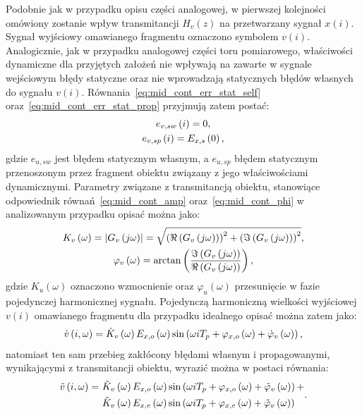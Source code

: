 Podobnie jak w przypadku opisu części analogowej, w pierwszej kolejności omówiony zostanie wpływ transmitancji $H_{v}(z)$ na przetwarzany sygnał $x(i)$. Sygnał wyjściowy omawianego fragmentu oznaczono symbolem $v(i)$. Analogicznie, jak w przypadku analogowej części toru pomiarowego, właściwości dynamiczne dla przyjętych założeń nie wpływają na zawarte w sygnale wejściowym błędy statyczne oraz nie wprowadzają statycznych błędów własnych do sygnału $v(i)$. Równania~\eqref{eq:mid_cont_err_stat_self} oraz~\eqref{eq:mid_cont_err_stat_prop} przyjmują zatem postać:
\begin{gather}
e_{v,sw} \left(i\right) = 0 \label{eq:mid_disc_err_stat_self}, \\
e_{v,sp} \left(i\right) = E_{x,s} \left(0\right) \label{eq:mid_disc_err_stat_prop},
\end{gather}
gdzie $e_{u,sw}$ jest błędem statycznym własnym, a $e_{u,sp}$ błędem statycznym przenoszonym przez fragment obiektu związany z jego właściwościami dynamicznymi. Parametry związane z transmitancją obiektu, stanowiące odpowiednik równań~\eqref{eq:mid_cont_amp} oraz~\eqref{eq:mid_cont_phi} w analizowanym przypadku opisać można jako:
\begin{gather}
K_{v} \left(\omega\right) = \left| G_{v} \left(j\omega\right) \right| = \sqrt{\left( \Re \left( G_{v} \left(j\omega\right) \right) \right)^{2} + \left( \Im \left( G_{v} \left(j\omega\right) \right) \right)^{2}} \label{eq:mid_disc_amp}, \\
\varphi_{v} \left(\omega\right) = \arctan \left( \frac{\Im \left( G_{v} \left(j\omega\right) \right)}{\Re \left( G_{v} \left(j\omega\right) \right)} \right) \label{eq:mid_disc_phi},
\end{gather}
gdzie $K_{u}(\omega)$ oznaczono wzmocnienie oraz $\varphi_{u}(\omega)$ przesunięcie w fazie pojedynczej harmonicznej sygnału. Pojedynczą harmoniczną wielkości wyjściowej $v(i)$ omawianego fragmentu dla przypadku idealnego opisać można zatem jako:
\begin{equation}
\dot{v} \left(i,\omega\right) = \dot{K}_{v} \left(\omega\right) E_{x,o} \left(\omega\right) \sin \left( \omega iT_{p} + \varphi_{x,o} \left(\omega\right) + \dot{\varphi}_{v} \left(\omega\right) \right) \label{eq:mid_disc_omega_ideal},
\end{equation}
natomiast ten sam przebieg zakłócony błędami własnym i propagowanymi, wynikającymi z transmitancji obiektu, wyrazić można w postaci równania:
\begin{equation}
\begin{split}
\tilde{v} \left(i,\omega\right) =~
& \tilde{K}_{v} \left(\omega\right) E_{x,o} \left(\omega\right) \sin \left( \omega iT_{p} + \varphi_{x,o} \left(\omega\right) + \tilde{\varphi}_{v} \left(\omega\right) \right) + \\
& \tilde{K}_{v} \left(\omega\right) E_{x,e} \left(\omega\right) \sin \left( \omega iT_{p} + \varphi_{x,e} \left(\omega\right) + \tilde{\varphi}_{v} \left(\omega\right) \right)
\end{split}
\label{eq:mid_disc_omega_real}.
\end{equation}

